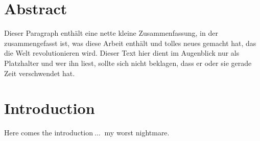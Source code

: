 \section*{Abstract}
Dieser Paragraph enthält eine nette kleine Zusammenfassung, in der zusammengefasst ist, was diese Arbeit enthält und tolles neues gemacht hat, das die Welt revolutionieren wird. Dieser Text hier dient im Augenblick nur als Platzhalter und wer ihn liest, sollte sich nicht beklagen, dass er oder sie gerade Zeit verschwendet hat.
\newpage

\section{Introduction}
Here comes the introduction$\ \ldots\ $ my worst nightmare.\newpage
